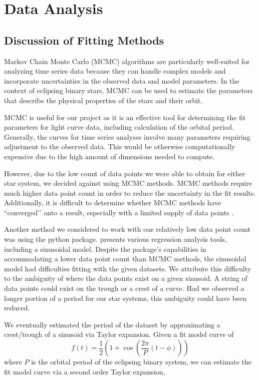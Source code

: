 \documentclass[12pt]{article}
\begin{document}
\newpage
\section{Data Analysis}

\subsection{Discussion of Fitting Methods}

Markov Chain Monte Carlo (MCMC) algorithms are particularly well-suited for analyzing time series data because they can handle complex models and incorporate uncertainties in the observed data and model parameters. In the context of eclipsing binary stars, MCMC can be used to estimate the parameters that describe the physical properties of the stars and their orbit.

MCMC is useful for our project as it is an effective tool for determining the fit parameters for light curve data, including calculation of the orbital period. Generally, the curves for time series analyses involve many parameters requiring adjustment to the observed data. This would be otherwise computationally expensive due to the high amount of dimensions needed to compute.

However, due to the low count of data points we were able to obtain for either star system, we decided against using MCMC methods. MCMC methods require much higher data point count in order to reduce the uncertainty in the fit results. Additionally, it is difficult to determine whether MCMC methods have ``converged’’ onto a result, especially with a limited supply of data points \cite{Ivezic2014}.

Another method we considered to work with our relatively low data point count was using the  python package.  presents various regression analysis tools, including a sinusoidal model. Despite the package’s capabilities in accommodating a lower data point count than MCMC methods, the sinusoidal model had difficulties fitting with the given datasets. We attribute this difficulty to the ambiguity of where the data points exist on a given sinusoid. A string of data points could exist on the trough or a crest of a curve. Had we observed a longer portion of a period for our star systems, this ambiguity could have been reduced.


We eventually estimated the period of the dataset by approximating a crest/trough of a sinusoid via Taylor expansion. Given a fit model curve of
\begin{equation}
    f(t) = \frac{1}{2}\left(1 + \cos\left(\frac{2\pi}{P} (t - \phi) \right)\right)
\end{equation} 
where $P$ is the orbital period of the eclipsing binary system, we can estimate the fit model curve via a second order Taylor expansion, 
\end{document}
